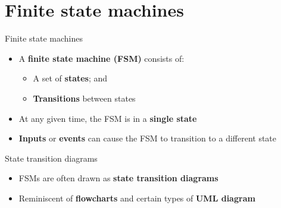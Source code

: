 \part{Finite state machines}
\frame{\partpage}

\begin{frame}{Finite state machines}
    \begin{itemize}
        \item A \textbf{finite state machine (FSM)} consists of: \pause
            \begin{itemize}
                \item A set of \textbf{states}; and \pause
                \item \textbf{Transitions} between states \pause
            \end{itemize}
        \item At any given time, the FSM is in a \textbf{single state} \pause
        \item \textbf{Inputs} or \textbf{events} can cause the FSM to transition to a different state
    \end{itemize}
\end{frame}

\begin{frame}{State transition diagrams}
    \begin{center}\end{center}
    \begin{itemize}
        \item FSMs are often drawn as \textbf{state transition diagrams}
        \item Reminiscent of \textbf{flowcharts} and certain types of \textbf{UML diagram} \pause
    \end{itemize}
\end{frame}

